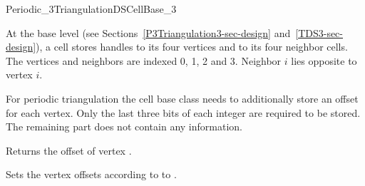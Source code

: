 

\begin{ccRefConcept}{Periodic_3TriangulationDSCellBase_3}


\ccDefinition
  
At the base level (see Sections~\ref{P3Triangulation3-sec-design} 
and~\ref{TDS3-sec-design}), a cell stores handles to its four vertices
and to its four neighbor cells.  The vertices and neighbors are
indexed 0, 1, 2 and 3. Neighbor $i$ lies opposite to vertex $i$.

\ccRefines {}

For periodic triangulation the cell base class needs to additionally
store an offset for each vertex.
Only the last three bits of each integer are required to be
stored. The remaining part does not contain any information.



\ccAccessFunctions
{}

{Returns the offset of vertex .
}


{Sets the vertex offsets according to  to .}

\ccHasModels


\ccSeeAlso

\\
\\




\end{ccRefConcept}

